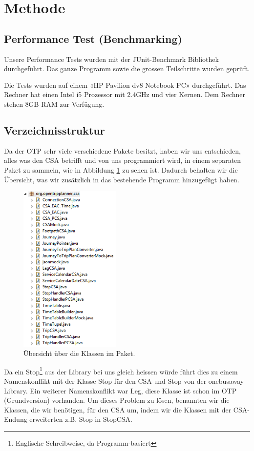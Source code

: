 \section{Methode}

\subsection{Performance Test (Benchmarking)}
Unsere \hypertarget{performanceTest}{Performance Tests} wurden mit der \gls{JUnit}-Benchmark Bibliothek durchgeführt. Das ganze Programm sowie die grossen Teilschritte wurden geprüft. \newline

Die Tests wurden auf einem «HP Pavilion dv8 Notebook PC» durchgeführt. Das Rechner hat einen Intel i5 Prozessor mit 2.4GHz und vier Kernen. Dem Rechner stehen 8GB RAM zur Verfügung.


\subsection{Verzeichnisstruktur}
Da der OTP sehr viele verschiedene Pakete besitzt, haben wir uns entschieden, alles was den CSA betrifft und von uns programmiert wird, in einem separaten Paket zu sammeln, wie in Abbildung \ref{fig:csapackage} zu sehen ist. Dadurch behalten wir die Übersicht, was wir zusätzlich in das bestehende Programm hinzugefügt haben. 

\begin{figure}[h]
	\centering
	\includegraphics[width=5cm]{img/csapackage.png}
	\caption{Übersicht über die Klassen im Paket.}
	\label{fig:csapackage}
\end{figure}

Da ein Stop\footnote{Englische Schreibweise, da Programm-basiert} aus der Library bei uns gleich heissen würde führt dies zu einem Namenskonflikt mit der Klasse Stop für den CSA und Stop von der onebusaway Library. Ein weiterer Namenskonflikt war Leg, diese Klasse ist schon im OTP (Grundversion) vorhanden.
Um dieses Problem zu lösen, benannten wir die Klassen, die wir benötigen, für den CSA um, indem wir die Klassen mit der CSA-Endung erweiterten z.B. Stop in StopCSA.\newline

